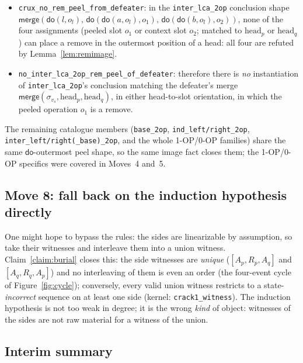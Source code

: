 \documentclass[11pt]{article}
\newcommand{\mergeL}{\mathsf{merge}}
\newcommand{\lean}[1]{\texttt{#1}}
\newcommand{\Ap}{A_p}
\newcommand{\Aq}{A_q}
\newcommand{\Rp}{R_p}
\newcommand{\Rq}{R_q}
\begin{document}
\begin{itemize}[leftmargin=2em]
\item \lean{crux\_no\_rem\_peel\_from\_defeater}: in the
  \lean{inter\_lca\_2op} conclusion shape
  $\mergeL(\mathsf{do}(l,o_l),\, \mathsf{do}(\mathsf{do}(a,o_l),o_1),\,
  \mathsf{do}(\mathsf{do}(b,o_l),o_2))$, none of the four assignments
  (peeled slot $o_1$ or context slot $o_2$; matched to
  $\mathrm{head}_p$ or $\mathrm{head}_q$) can place a remove in the
  outermost position of a head: all four are refuted by
  Lemma~\ref{lem:remimage}.
\item \lean{no\_inter\_lca\_2op\_rem\_peel\_of\_defeater}: therefore
  there is \emph{no} instantiation of \lean{inter\_lca\_2op}'s
  conclusion matching the defeater's merge
  $\mergeL(\sigma_{v_s}, \mathrm{head}_p, \mathrm{head}_q)$, in either
  head-to-slot orientation, in which the peeled operation $o_1$ is a
  remove.
\end{itemize}

The remaining catalogue members (\lean{base\_2op},
\lean{ind\_left/right\_2op}, \lean{inter\_left/right(\_base)\_2op},
and the whole \textsc{1-OP}/\textsc{0-OP} families) share the same
$\mathsf{do}$-outermost peel shape, so the same image fact closes them;
the \textsc{1-OP}/\textsc{0-OP} specifics were covered in
Moves~4 and~5.

\subsection{Move 8: fall back on the induction hypothesis directly}

One might hope to bypass the rules: the sides are linearizable by
assumption, so take their witnesses and interleave them into a union
witness. Claim~\ref{claim:burial} closes this: the side witnesses are
\emph{unique} ($[\Ap,\Rp,\Aq]$ and $[\Aq,\Rq,\Ap]$) and no
interleaving of them is even an order (the four-event cycle of
Figure~\ref{fig:cycle}); conversely, every valid union witness
restricts to a state-\emph{incorrect} sequence on at least one side
(kernel: \lean{crack1\_witness}). The induction hypothesis is not too
weak in degree; it is the wrong \emph{kind} of object: witnesses of
the sides are not raw material for a witness of the union.

\subsection{Interim summary}
\end{document}
